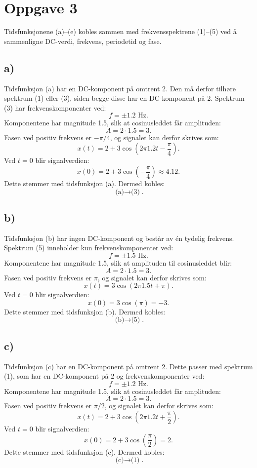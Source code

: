 \hypertarget{oppgave3}{}
\section*{Oppgave 3}

Tidsfunksjonene (a)--(e) kobles sammen med frekvensspektrene (1)--(5) ved å sammenligne DC-verdi, frekvens, periodetid og fase.

\subsection*{a)}
Tidsfunksjon (a) har en DC-komponent på omtrent 2.
Den må derfor tilhøre spektrum (1) eller (3), siden begge disse har en DC-komponent på 2.
Spektrum (3) har frekvenskomponenter ved:
\[
f=\pm1.2\text{ Hz}.
\]
Komponentene har magnitude 1.5, slik at cosinusleddet får amplituden:
\[
A=2\cdot1.5=3.
\]
Fasen ved positiv frekvens er $-\pi/4$, og signalet kan derfor skrives som:
\[
x(t)=2+3\cos\left(2\pi1.2t-\frac{\pi}{4}\right).
\]
Ved $t=0$ blir signalverdien:
\[
x(0)=2+3\cos\left(-\frac{\pi}{4}\right)\approx4.12.
\]
Dette stemmer med tidsfunksjon (a).
Dermed kobles:
\[
\boxed{\text{(a)}\rightarrow\text{(3)}}.
\]
\subsection*{b)}
Tidsfunksjon (b) har ingen DC-komponent og består av én tydelig frekvens.
Spektrum (5) inneholder kun frekvenskomponenter ved:
\[
f=\pm1.5\text{ Hz}.
\]
Komponentene har magnitude 1.5, slik at amplituden til cosinusleddet blir:
\[
A=2\cdot1.5=3.
\]
Fasen ved positiv frekvens er $\pi$, og signalet kan derfor skrives som:
\[
x(t)=3\cos(2\pi1.5t+\pi).
\]
Ved $t=0$ blir signalverdien:
\[
x(0)=3\cos(\pi)=-3.
\]
Dette stemmer med tidsfunksjon (b).
Dermed kobles:
\[
\boxed{\text{(b)}\rightarrow\text{(5)}}.
\]

\subsection*{c)}
Tidsfunksjon (c) har en DC-komponent på omtrent 2.
Dette passer med spektrum (1), som har en DC-komponent på 2 og frekvenskomponenter ved:
\[
f=\pm1.2\text{ Hz}.
\]
Komponentene har magnitude 1.5, slik at cosinusleddet får amplituden:
\[
A=2\cdot1.5=3.
\]
Fasen ved positiv frekvens er $\pi/2$, og signalet kan derfor skrives som:
\[
x(t)=2+3\cos\left(2\pi1.2t+\frac{\pi}{2}\right).
\]
Ved $t=0$ blir signalverdien:
\[
x(0)=2+3\cos\left(\frac{\pi}{2}\right)=2.
\]
Dette stemmer med tidsfunksjon (c).
Dermed kobles:
\[
\boxed{\text{(c)}\rightarrow\text{(1)}}.
\]
